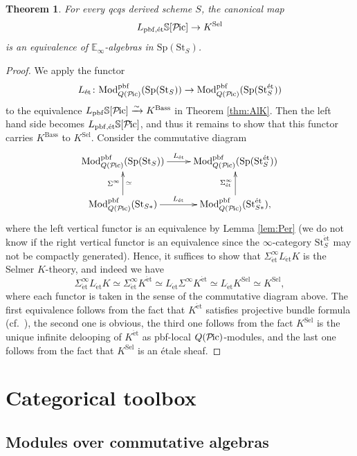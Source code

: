 \documentclass{amsart}
\theoremstyle{plain}
\newtheorem{theorem}{Theorem}[subsection]
\theoremstyle{definition}
\theoremstyle{remark}
\numberwithin{equation}{theorem}
\newcommand{\mbb}[1]{\mathbb{#1}}
\newcommand{\Bass}{\mathrm{Bass}}
\newcommand{\Mod}{\mathrm{Mod}}
\newcommand{\Sel}{\mathrm{Sel}}
\newcommand{\Sp}{\mathrm{Sp}}
\newcommand{\St}{\mathrm{St}}
\newcommand{\et}{\mathrm{\acute{e}t}}
\newcommand{\pbf}{\mathrm{pbf}}
\newcommand{\Pic}{{\mathcal{P}\mspace{-2.0mu}\mathrm{ic}}}
\begin{document}
\begin{theorem}\label{thm:SeK}
For every qcqs derived scheme $S$, the canonical map
\[
	L_{\pbf,\et}\mbb{S}[\Pic] \to K^\Sel
\]
is an equivalence of $\mbb{E}_\infty$-algebras in $\Sp(\St_S)$.
\end{theorem}
\begin{proof}
We apply the functor
\[
	L_\et\colon\Mod_{Q(\Pic)}^\pbf(\Sp(\St_S))\to\Mod_{Q(\Pic)}^\pbf(\Sp(\St^\et_S))
\]
to the equivalence $L_\pbf\mbb{S}[\Pic]\xrightarrow{\sim}K^\Bass$ in Theorem \ref{thm:AlK}.
Then the left hand side becomes $L_{\pbf,\et}\mbb{S}[\Pic]$, and thus it remains to show that this functor carries $K^\Bass$ to $K^\Sel$.
Consider the commutative diagram
\[
\xymatrix{
	\Mod_{Q(\Pic)}^\pbf(\Sp(\St_S)) \ar[r]^-{L_\et} & \Mod_{Q(\Pic)}^\pbf(\Sp(\St^\et_S)) \\
	\Mod_{Q(\Pic)}^\pbf(\St_{S*}) \ar[r]^-{L_\et} \ar[u]^{\Sigma^\infty}_\simeq & \Mod_{Q(\Pic)}^\pbf(\St^\et_{S*}), \ar[u]^{\Sigma^\infty_\et}
}
\]
where the left vertical functor is an equivalence by Lemma \ref{lem:Per} (we do not know if the right vertical functor is an equivalence since the $\infty$-category $\St^\et_S$ may not be compactly generated).
Hence, it suffices to show that $\Sigma^\infty_\et L_\et K$ is the Selmer $K$-theory, and indeed we have
\[
	\Sigma^\infty_\et L_\et K \simeq \Sigma^\infty_\et K^\et
							\simeq L_\et\Sigma^\infty K^\et
							\simeq L_\et K^\Sel
							\simeq K^\Sel,
\]
where each functor is taken in the sense of the commutative diagram above.
The first equivalence follows from the fact that $K^\et$ satisfies projective bundle formula (cf.\ \cite[Theorem 1.1]{CM}), the second one is obvious, the third one follows from the fact $K^\Sel$ is the unique infinite delooping of $K^\et$ as pbf-local $Q(\Pic)$-modules, and the last one follows from the fact that $K^\Sel$ is an \'etale sheaf.
\end{proof}




\newpage

\appendix

\section{Categorical toolbox}\label{CPr}

\subsection{Modules over commutative algebras}\label{Mod}
\end{document}

